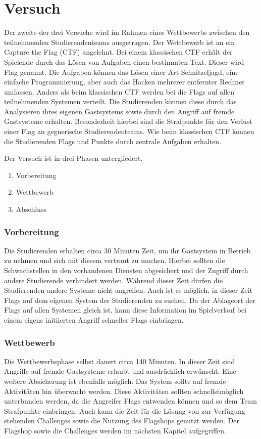 \section{Versuch }
\label{sec:Versuch}

Der zweite der drei Versuche  wird im Rahmen eines Wettbewerbs zwischen den teilnehmenden Studierendenteams ausgetragen. Der Wettbewerb ist an ein Capture the Flag (CTF) angelehnt. Bei einem klassischen CTF erhält der Spielende durch das Lösen von Aufgaben einen bestimmten Text. Dieser wird Flag genannt. Die Aufgaben können das Lösen einer Art Schnitzeljagd, eine einfache Programmierung, aber auch das Hacken mehrerer entfernter Rechner umfassen. Anders als beim klassischen CTF werden bei  die Flags auf allen teilnehmenden Systemen verteilt. \cite{tanWhatCTFHow2020} Die Studierenden können diese durch das Analysieren ihres eigenen Gastsystems sowie durch den Angriff auf fremde Gastsysteme erhalten. Besonderheit hierbei sind die Strafpunkte für den Verlust einer Flag an gegnerische Studierendenteams. Wie beim klassischen CTF können die Studierenden Flags und Punkte durch zentrale Aufgaben erhalten.

Der Versuch ist in drei Phasen untergliedert.
\begin{enumerate}
	\item Vorbereitung
	\item Wettbewerb
	\item Abschluss
\end{enumerate}

\subsubsection{Vorbereitung}
Die Studierenden erhalten circa 30 Minuten Zeit, um ihr Gastsystem in Betrieb zu nehmen und sich mit diesem vertraut zu machen. Hierbei sollten die Schwachstellen in den vorhandenen Diensten abgesichert und der Zugriff durch andere Studierende verhindert werden. Während dieser Zeit dürfen die Studierenden andere Systeme nicht angreifen. Auch ist es möglich, in dieser Zeit Flags auf dem eigenen System der Studierenden zu suchen. Da der Ablageort der Flags auf allen Systemen gleich ist, kann diese Information im Spielverlauf bei einem eigens initiierten Angriff schneller Flags einbringen.

\subsubsection{Wettbewerb}
Die Wettbewerbsphase selbst dauert circa 140 Minuten. In dieser Zeit sind Angriffe auf fremde Gastsysteme erlaubt und ausdrücklich erwünscht. Eine weitere Absicherung ist ebenfalls möglich. Das System sollte auf fremde Aktivitäten hin überwacht werden. Diese Aktivitäten sollten schnellstmöglich unterbunden werden, da die Angreifer Flags entwenden können und so dem Team Strafpunkte einbringen. Auch kann die Zeit für die Lösung von zur Verfügung stehenden Challenges sowie die Nutzung des Flagshops genutzt werden. Der Flagshop sowie die Challenges werden im nächsten Kapitel aufgegriffen.

